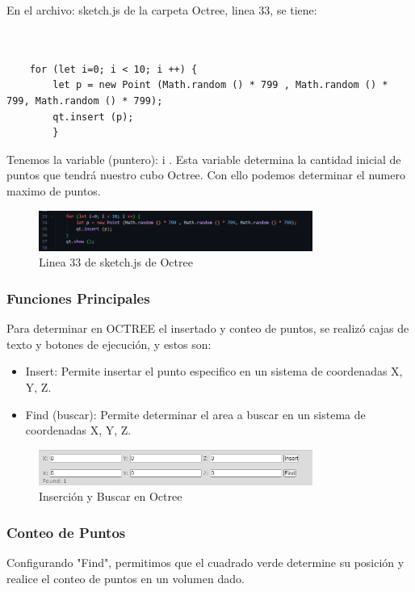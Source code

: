 \documentclass{article}
\begin{document}
En el archivo: sketch.js de la carpeta Octree, linea 33, se tiene:

\begin{verbatim}


    for (let i=0; i < 10; i ++) {
        let p = new Point (Math.random () * 799 , Math.random () * 799, Math.random () * 799);
        qt.insert (p);
        }
\end{verbatim}

Tenemos la variable (puntero): i . Esta variable determina la cantidad inicial de puntos que tendrá nuestro cubo Octree. Con ello podemos determinar el numero maximo de puntos.

\begin{figure}[H]
\centering
\includegraphics[width=0.8\textwidth]{img/oct_linea33.png}
\caption{Linea 33 de sketch.js de Octree}
\end{figure}



\subsubsection{Funciones Principales}

Para determinar en OCTREE el insertado y conteo de puntos, se realizó cajas de texto y botones de ejecución, y estos son:

\begin{itemize}
    \item Insert: Permite insertar el punto especifico en un sistema de coordenadas X, Y, Z.
    \item Find (buscar): Permite determinar el area a buscar en un sistema de coordenadas X, Y, Z.
\end{itemize}

\begin{figure}[H]
\centering
\includegraphics[width=0.8\textwidth]{img/oct_insertfind.png}
\caption{Inserción y Buscar en Octree}
\end{figure}

\subsubsection{Conteo de Puntos}
Configurando "Find", permitimos que el cuadrado verde determine su posición y realice el conteo de puntos en un volumen dado.
\end{document}
